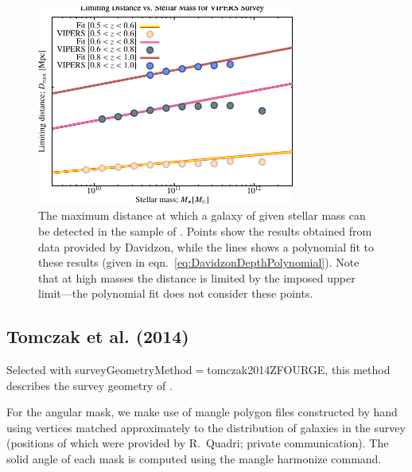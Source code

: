 \begin{figure}
 \begin{center}
 \includegraphics[width=85mm,trim=0mm 0mm 0mm 4mm,clip]{Plots/DataAnalysis/DavidzonVIPERSMassDistanceRelation.pdf}
 \end{center}
 \caption{The maximum distance at which a galaxy of given stellar mass can be detected in the sample of \protect\cite{davidzon_vimos_2013}. Points show the results obtained from data provided by Davidzon, while the lines shows a polynomial fit to these results (given in eqn.~\ref{eq:DavidzonDepthPolynomial}). Note that at high masses the distance is limited by the imposed upper limit---the polynomial fit does not consider these points.}
 \label{fig:Davidzon2013DepthFit}
\end{figure}

\subsection{Tomczak et al. (2014)}\label{phys:surveyGeometry:surveyGeometryTomczak2014ZFOURGE}

Selected with {\normalfont \ttfamily surveyGeometryMethod}$=${\normalfont \ttfamily tomczak2014ZFOURGE}, this method describes the survey geometry of \cite{tomczak_galaxy_2014}. 

For the angular mask, we make use of {\normalfont \ttfamily mangle} polygon files constructed by hand using vertices matched approximately to the distribution of galaxies in the survey (positions of which were provided by R.~Quadri; private communication). The solid angle of each mask is computed using the {\normalfont \ttfamily mangle} {\normalfont \ttfamily harmonize} command.

